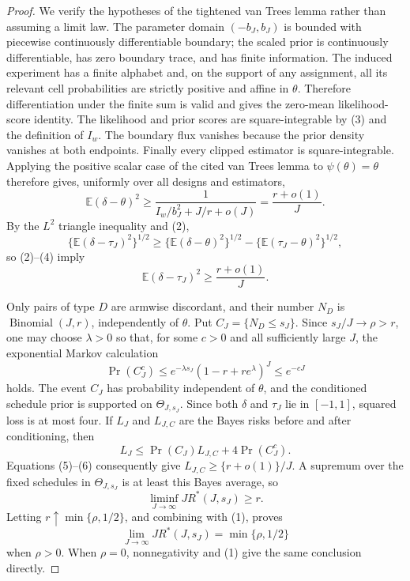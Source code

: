 \documentclass{article}
\begin{document}
\begin{proof}
We verify the hypotheses of the tightened van Trees lemma rather than assuming a limit law.  The parameter domain \((-b_J,b_J)\) is bounded with piecewise continuously differentiable boundary; the scaled prior is continuously differentiable, has zero boundary trace, and has finite information.  The induced experiment has a finite alphabet and, on the support of any assignment, all its relevant cell probabilities are strictly positive and affine in \(\theta\).  Therefore differentiation under the finite sum is valid and gives the zero-mean likelihood-score identity.  The likelihood and prior scores are square-integrable by (3) and the definition of \(I_w\).  The boundary flux vanishes because the prior density vanishes at both endpoints.  Finally every clipped estimator is square-integrable.  Applying the positive scalar case of the cited van Trees lemma to \(\psi(\theta)=\theta\) therefore gives, uniformly over all designs and estimators,
\[
 \mathbb E(\delta-\theta)^2
 \ge \frac1{I_w/b_J^2+J/r+o(J)}
 =\frac{r+o(1)}J.
 \tag{4}
\]
By the \(L^2\) triangle inequality and (2),
\[
 \{\mathbb E(\delta-\tau_J)^2\}^{1/2}
 \ge
 \{\mathbb E(\delta-\theta)^2\}^{1/2}
 -\{\mathbb E(\tau_J-\theta)^2\}^{1/2},
\]
so (2)--(4) imply
\[
 \mathbb E(\delta-\tau_J)^2\ge\frac{r+o(1)}J.
 \tag{5}
\]

Only pairs of type \(D\) are armwise discordant, and their number \(N_D\) is \(\operatorname{Binomial}(J,r)\), independently of \(\theta\).  Put \(C_J=\{N_D\le s_J\}\).  Since \(s_J/J\to\rho>r\), one may choose \(\lambda>0\) so that, for some \(c>0\) and all sufficiently large \(J\), the exponential Markov calculation
\[
 \Pr(C_J^c)
 \le e^{-\lambda s_J}(1-r+re^\lambda)^J
 \le e^{-cJ}
 \tag{6}
\]
holds.  The event \(C_J\) has probability independent of \(\theta\), and the conditioned schedule prior is supported on \(\Theta_{J,s_J}\).  Since both \(\delta\) and \(\tau_J\) lie in \([-1,1]\), squared loss is at most four.  If \(L_J\) and \(L_{J,C}\) are the Bayes risks before and after conditioning, then
\[
 L_J
 \le \Pr(C_J)L_{J,C}+4\Pr(C_J^c).
\]
Equations (5)--(6) consequently give \(L_{J,C}\ge\{r+o(1)\}/J\).  A supremum over the fixed schedules in \(\Theta_{J,s_J}\) is at least this Bayes average, so
\[
 \liminf_{J\to\infty}J R^*(J,s_J)\ge r.
\]
Letting \(r\uparrow\min\{\rho,1/2\}\), and combining with (1), proves
\[
 \lim_{J\to\infty}J R^*(J,s_J)=\min\{\rho,1/2\}
\]
when \(\rho>0\).  When \(\rho=0\), nonnegativity and (1) give the same conclusion directly.


\end{proof}
\end{document}
